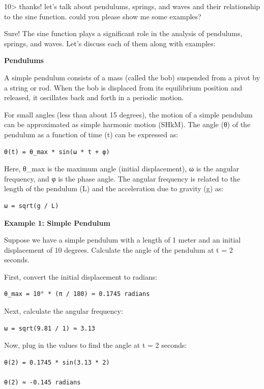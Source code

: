 \documentclass[
]{article}
\begin{document}
10\textgreater{} thanks! let's talk about pendulums, springs, and waves
and their relationship to the sine function. could you please show me
some examples?

Sure! The sine function plays a significant role in the analysis of
pendulums, springs, and waves. Let's discuss each of them along with
examples:

\textbf{Pendulums}

A simple pendulum consists of a mass (called the bob) suspended from a
pivot by a string or rod. When the bob is displaced from its equilibrium
position and released, it oscillates back and forth in a periodic
motion.

For small angles (less than about 15 degrees), the motion of a simple
pendulum can be approximated as simple harmonic motion (SHkM). The angle
(θ) of the pendulum as a function of time (t) can be expressed as:

\begin{verbatim}
θ(t) = θ_max * sin(ω * t + φ)
\end{verbatim}

Here, θ\_max is the maximum angle (initial displacement), ω is the
angular frequency, and φ is the phase angle. The angular frequency is
related to the length of the pendulum (L) and the acceleration due to
gravity (g) as:

\begin{verbatim}
ω = sqrt(g / L)
\end{verbatim}

\textbf{Example 1: Simple Pendulum}

Suppose we have a simple pendulum with a length of 1 meter and an
initial displacement of 10 degrees. Calculate the angle of the pendulum
at t = 2 seconds.

First, convert the initial displacement to radians:

\begin{verbatim}
θ_max = 10° * (π / 180) ≈ 0.1745 radians
\end{verbatim}

Next, calculate the angular frequency:

\begin{verbatim}
ω = sqrt(9.81 / 1) ≈ 3.13
\end{verbatim}

Now, plug in the values to find the angle at t = 2 seconds:

\begin{verbatim}
θ(2) = 0.1745 * sin(3.13 * 2)

θ(2) ≈ -0.145 radians
\end{verbatim}
\end{document}
